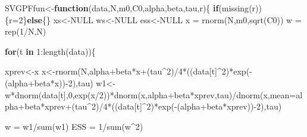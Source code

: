 \documentclass[
]{book}
\newenvironment{Shaded}{\begin{snugshade}}{\end{snugshade}}
\newcommand{\AttributeTok}[1]{\textcolor[rgb]{0.77,0.63,0.00}{#1}}
\newcommand{\ConstantTok}[1]{\textcolor[rgb]{0.00,0.00,0.00}{#1}}
\newcommand{\ControlFlowTok}[1]{\textcolor[rgb]{0.13,0.29,0.53}{\textbf{#1}}}
\newcommand{\DecValTok}[1]{\textcolor[rgb]{0.00,0.00,0.81}{#1}}
\newcommand{\FunctionTok}[1]{\textcolor[rgb]{0.00,0.00,0.00}{#1}}
\newcommand{\NormalTok}[1]{#1}
\newcommand{\OtherTok}[1]{\textcolor[rgb]{0.56,0.35,0.01}{#1}}
\newcommand{\SpecialCharTok}[1]{\textcolor[rgb]{0.00,0.00,0.00}{#1}}
\theoremstyle{break}
\theoremstyle{nonumberplain}
\begin{document}
\begin{Shaded}
\begin{Highlighting}[]
\NormalTok{SVGPFfun}\OtherTok{\textless{}{-}}\ControlFlowTok{function}\NormalTok{(data,N,m0,C0,alpha,beta,tau,r)\{}
  \ControlFlowTok{if}\NormalTok{(}\FunctionTok{missing}\NormalTok{(r))\{r}\OtherTok{=}\DecValTok{2}\NormalTok{\}}\ControlFlowTok{else}\NormalTok{\{\}}
\NormalTok{  xs}\OtherTok{\textless{}{-}}\ConstantTok{NULL}
\NormalTok{  ws}\OtherTok{\textless{}{-}}\ConstantTok{NULL}
\NormalTok{  ess}\OtherTok{\textless{}{-}}\ConstantTok{NULL}
\NormalTok{  x  }\OtherTok{=} \FunctionTok{rnorm}\NormalTok{(N,m0,}\FunctionTok{sqrt}\NormalTok{(C0))}
\NormalTok{  w  }\OtherTok{=} \FunctionTok{rep}\NormalTok{(}\DecValTok{1}\SpecialCharTok{/}\NormalTok{N,N)}
  
  \ControlFlowTok{for}\NormalTok{(t }\ControlFlowTok{in} \DecValTok{1}\SpecialCharTok{:}\FunctionTok{length}\NormalTok{(data))\{}
    
\NormalTok{    xprev}\OtherTok{\textless{}{-}}\NormalTok{x}
\NormalTok{    x}\OtherTok{\textless{}{-}}\FunctionTok{rnorm}\NormalTok{(N,alpha}\SpecialCharTok{+}\NormalTok{beta}\SpecialCharTok{*}\NormalTok{x}\SpecialCharTok{+}\NormalTok{(tau}\SpecialCharTok{\^{}}\DecValTok{2}\NormalTok{)}\SpecialCharTok{/}\DecValTok{4}\SpecialCharTok{*}\NormalTok{((data[t]}\SpecialCharTok{\^{}}\DecValTok{2}\NormalTok{)}\SpecialCharTok{*}\FunctionTok{exp}\NormalTok{(}\SpecialCharTok{{-}}\NormalTok{(alpha}\SpecialCharTok{+}\NormalTok{beta}\SpecialCharTok{*}\NormalTok{x))}\SpecialCharTok{{-}}\DecValTok{2}\NormalTok{),tau)}
\NormalTok{    w1}\OtherTok{\textless{}{-}}\NormalTok{w}\SpecialCharTok{*}\FunctionTok{dnorm}\NormalTok{(data[t],}\DecValTok{0}\NormalTok{,}\FunctionTok{exp}\NormalTok{(x}\SpecialCharTok{/}\DecValTok{2}\NormalTok{))}\SpecialCharTok{*}\FunctionTok{dnorm}\NormalTok{(x,alpha}\SpecialCharTok{+}\NormalTok{beta}\SpecialCharTok{*}\NormalTok{xprev,tau)}\SpecialCharTok{/}\FunctionTok{dnorm}\NormalTok{(x,}\AttributeTok{mean=}\NormalTok{alpha}\SpecialCharTok{+}\NormalTok{beta}\SpecialCharTok{*}\NormalTok{xprev}\SpecialCharTok{+}\NormalTok{(tau}\SpecialCharTok{\^{}}\DecValTok{2}\NormalTok{)}\SpecialCharTok{/}\DecValTok{4}\SpecialCharTok{*}\NormalTok{((data[t]}\SpecialCharTok{\^{}}\DecValTok{2}\NormalTok{)}\SpecialCharTok{*}\FunctionTok{exp}\NormalTok{(}\SpecialCharTok{{-}}\NormalTok{(alpha}\SpecialCharTok{+}\NormalTok{beta}\SpecialCharTok{*}\NormalTok{xprev))}\SpecialCharTok{{-}}\DecValTok{2}\NormalTok{),tau)}
    
\NormalTok{    w }\OtherTok{=}\NormalTok{ w1}\SpecialCharTok{/}\FunctionTok{sum}\NormalTok{(w1)}
\NormalTok{    ESS  }\OtherTok{=} \DecValTok{1}\SpecialCharTok{/}\FunctionTok{sum}\NormalTok{(w}\SpecialCharTok{\^{}}\DecValTok{2}\NormalTok{)}
    

\end{Highlighting}
\end{Shaded}
\end{document}
